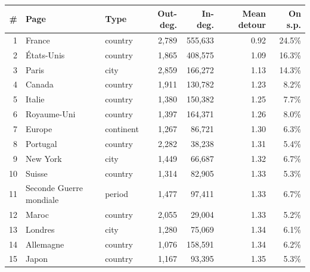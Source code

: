 \begin{tabular}{@{}rlp{1.5cm}rrrr@{}}
\toprule
\# & Page & Type & Out-deg. & In-deg. & Mean detour & On s.p. \\
\midrule
1 & France & country & 2{,}789 & 555{,}633 & 0.92 & 24.5\% \\
2 & États-Unis & country & 1{,}865 & 408{,}575 & 1.09 & 16.3\% \\
3 & Paris & city & 2{,}859 & 166{,}272 & 1.13 & 14.3\% \\
4 & Canada & country & 1{,}911 & 130{,}782 & 1.23 & 8.2\% \\
5 & Italie & country & 1{,}380 & 150{,}382 & 1.25 & 7.7\% \\
6 & Royaume-Uni & country & 1{,}397 & 164{,}371 & 1.26 & 8.0\% \\
7 & Europe & continent & 1{,}267 & 86{,}721 & 1.30 & 6.3\% \\
8 & Portugal & country & 2{,}282 & 38{,}238 & 1.31 & 5.4\% \\
9 & New York & city & 1{,}449 & 66{,}687 & 1.32 & 6.7\% \\
10 & Suisse & country & 1{,}314 & 82{,}905 & 1.33 & 5.3\% \\
11 & Seconde Guerre mondiale & period & 1{,}477 & 97{,}411 & 1.33 & 6.7\% \\
12 & Maroc & country & 2{,}055 & 29{,}004 & 1.33 & 5.2\% \\
13 & Londres & city & 1{,}280 & 75{,}069 & 1.34 & 6.1\% \\
14 & Allemagne & country & 1{,}076 & 158{,}591 & 1.34 & 6.2\% \\
15 & Japon & country & 1{,}167 & 93{,}395 & 1.35 & 5.3\% \\
\bottomrule
\end{tabular}
